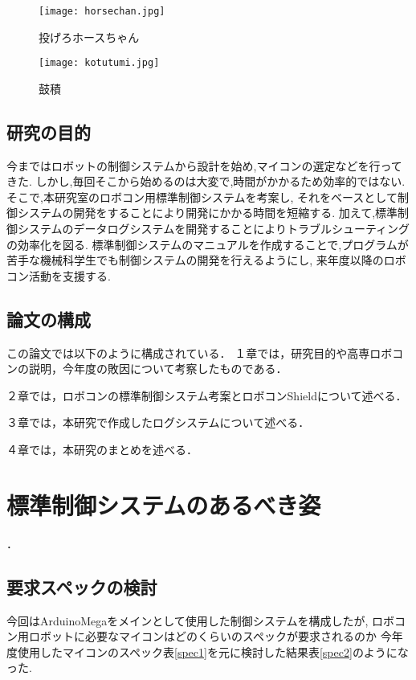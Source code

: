 \documentclass[12pt,oneside]{paper}
\begin{document}
\begin{figure}[H]
 \begin{center}
  \texttt{[image: horsechan.jpg]}
 \end{center}
 \caption{投げろホースちゃん}
 \label{fig:horse}
\end{figure}


\begin{figure}[H]
 \begin{center}
  \texttt{[image: kotutumi.jpg]}
 \end{center}
 \caption{鼓積}
 \label{fig:tutumi}
\end{figure}


\section{研究の目的}
今まではロボットの制御システムから設計を始め,マイコンの選定などを行ってきた.
しかし,毎回そこから始めるのは大変で,時間がかかるため効率的ではない.
そこで,本研究室のロボコン用標準制御システムを考案し,
それをベースとして制御システムの開発をすることにより開発にかかる時間を短縮する.
加えて,標準制御システムのデータログシステムを開発することによりトラブルシューティングの効率化を図る.
標準制御システムのマニュアルを作成することで,プログラムが苦手な機械科学生でも制御システムの開発を行えるようにし,
来年度以降のロボコン活動を支援する.


\section{論文の構成}
この論文では以下のように構成されている．
１章では，研究目的や高専ロボコンの説明，今年度の敗因について考察したものである．


２章では，ロボコンの標準制御システム考案とロボコンShieldについて述べる．


３章では，本研究で作成したログシステムについて述べる．


４章では，本研究のまとめを述べる．


\chapter{標準制御システムのあるべき姿}．\\

\section{要求スペックの検討}
今回はArduinoMegaをメインとして使用した制御システムを構成したが,
ロボコン用ロボットに必要なマイコンはどのくらいのスペックが要求されるのか
今年度使用したマイコンのスペック表\ref{spec1}を元に検討した結果表\ref{spec2}のようになった.
\end{document}
